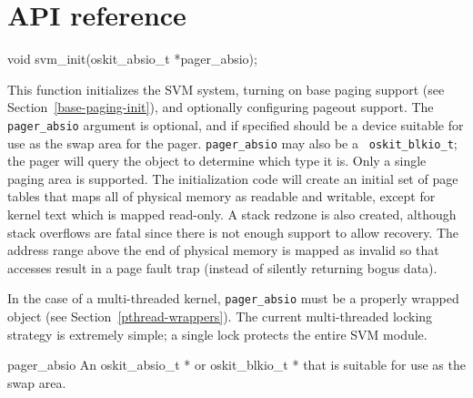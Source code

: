 \section{API reference}

\begin{apisyn}

	\funcproto void svm_init(oskit_absio_t *pager_absio);
\end{apisyn}
\begin{apidesc}
	This function initializes the SVM system, turning on base paging
	support (see Section~\ref{base-paging-init}), and optionally
	configuring pageout support. The {\tt pager_absio} argument is
	optional, and if specified should be a device suitable for use as
	the swap area for the pager. {\tt pager_absio} may also be a {\tt
	oskit_blkio_t}; the pager will query the object to determine which
	type it is. Only a single paging area is supported. The
	initialization code will create an initial set of page tables that
	maps all of physical memory as readable and writable, except for
	kernel text which is mapped read-only. A stack redzone is also
	created, although stack overflows are fatal since there is not
	enough support to allow recovery. The address range above the end
	of physical memory is mapped as invalid so that accesses result in
	a page fault trap (instead of silently returning bogus data).

	In the case of a multi-threaded kernel, {\tt pager_absio} must be a
	properly wrapped object (see Section~\ref{pthread-wrappers}).  The
	current multi-threaded locking strategy is extremely simple; a
	single lock protects the entire SVM module.
\end{apidesc}
\begin{apiparm}
	\item[pager_absio]
		An {oskit_absio_t *} or {oskit_blkio_t *} that is suitable
		for use as the swap area.
\end{apiparm}


